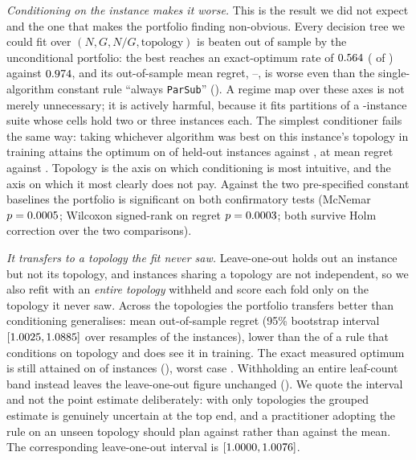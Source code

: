 \documentclass[journal,10pt]{IEEEtran}
\theoremstyle{plain}
\theoremstyle{definition}
\theoremstyle{remark}
\newcommand{\sv}[1]{\texttt{#1}}
\begin{document}
\emph{Conditioning on the instance makes it worse.} This is the result we did
not expect and the one that makes the portfolio finding non-obvious. Every
decision tree we could fit over $(N, G, N/G, \text{topology})$ is beaten out
of sample by the unconditional portfolio: the best reaches an exact-optimum
rate of $0.564$ (\SelTreeOpt{} of \TournNInst{}) against
$0.974$, and its out-of-sample mean regret,
\SelTreeMeanLo{}--\SelTreeMeanHi{}, is worse even than the single-algorithm
constant rule ``always \sv{ParSub}'' (\SelConstMean{}). A regime map over
these axes is not merely unnecessary; it is actively harmful, because it fits
partitions of a \TournNInst{}-instance suite whose cells hold two or three
instances each. The simplest conditioner fails the same way: taking whichever
algorithm was best on this instance's topology in training attains the optimum
on \SelCondTopoOpt{} of \TournNInst{} held-out instances against
\SelKFourOpt{}, at mean regret \SelCondTopoMean{} against \SelKFourMean{}.
Topology is the axis on which conditioning is most intuitive, and the axis on
which it most clearly does not pay. Against the two pre-specified constant
baselines the portfolio is significant on both confirmatory tests (McNemar
$p = 0.0005$; Wilcoxon signed-rank on regret $p = 0.0003$; both
survive Holm correction over the two comparisons).

\emph{It transfers to a topology the fit never saw.} Leave-one-out holds out
an instance but not its topology, and instances sharing a topology are not
independent, so we also refit with an \emph{entire topology} withheld and
score each fold only on the topology it never saw. Across the
\SelTopoGroups{} topologies the portfolio transfers better than conditioning
generalises: mean out-of-sample regret \SelUnseenTopoMean{} (95\% bootstrap
interval $[1.0025, 1.0885]$ over \SelBootReps{} resamples
of the \TournNInst{} instances), lower than the \SelCondTopoMean{} of a rule
that conditions on topology and does see it in training. The exact measured
optimum is still attained on \SelUnseenTopoOpt{} of \TournNInst{} instances
(\SelUnseenTopoPct{}), worst case \SelUnseenTopoWorst{}. Withholding an entire
leaf-count band instead leaves the leave-one-out figure unchanged
(\SelUnseenScaleMean{}). We quote the interval and not the point estimate
deliberately: with only \SelTopoGroups{} topologies the grouped estimate is
genuinely uncertain at the top end, and a practitioner adopting the rule on an
unseen topology should plan against \SelUnseenTopoHi{} rather than against the
mean. The corresponding leave-one-out interval is
$[1.0000, 1.0076]$.
\end{document}
